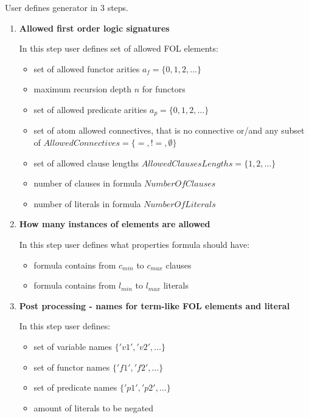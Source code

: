User defines generator in 3 steps.
\begin{enumerate}
  \item \textbf{Allowed first order logic signatures}

    In this step user defines set of allowed \gls{FOL} elements:
    \begin{itemize}
      \item set of allowed functor arities $a_f = \{0, 1, 2,\dots\}$
      \item maximum recursion depth $n$ for functors
      \item set of allowed predicate arities $a_p = \{0, 1, 2,\dots\}$
      \item set of atom allowed connectives, that is no connective or/and any subset of $AllowedConnectives = \{=, !=, \emptyset\}$
      \item set of allowed clause lengths $AllowedClausesLengths = \{1,2,\dots\}$
      \item number of clauses in formula $NumberOfClauses$
      \item number of literals in formula $NumberOfLiterals$
    \end{itemize}

  \item \textbf{How many instances of elements are allowed}

    In this step user defines what properties formula should have:
    \begin{itemize}
      \item formula contains from $c_{min}$ to $c_{max}$ clauses
      \item formula contains from $l_{min}$ to $l_{max}$ literals
    \end{itemize}

  \item \textbf{Post processing - names for term-like FOL elements and literal}

    In this step user defines:
    \begin{itemize}
      \item set of variable names $\{'v1','v2',\dots\}$
      \item set of functor names $\{'f1','f2',\dots\}$
      \item set of predicate names $\{'p1','p2',\dots\}$
      \item amount of literals to be negated
    \end{itemize}
\end{enumerate}

